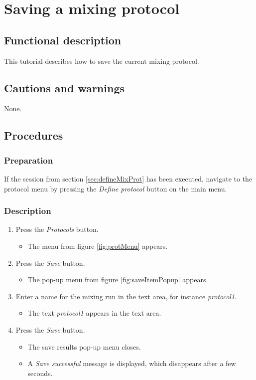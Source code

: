 
\section{Saving a mixing protocol}\label{sec:savmixprot}

\subsection{Functional description}
This tutorial describes how to save the current mixing protocol.

\subsection{Cautions and warnings}
None.

\subsection{Procedures}

\subsubsection{Preparation}
If the session from section \ref{sec:defineMixProt} has been executed, navigate to the protocol menu by pressing the \emph{Define protocol} button on the main menu.

\subsubsection{Description}
\begin{enumerate}
	\item Press the \emph{Protocols} button.
		\begin{itemize}
			\item The menu from figure \ref{fig:protMenu} appears.
		\end{itemize}
	\item Press the \emph{Save} button.
		\begin{itemize}
			\item The pop-up menu from figure \ref{fig:saveItemPopup} appears.
		\end{itemize}
	\item Enter a name for the mixing run in the text area, for instance \emph{protocol1}. \label{item:savmixprotName}
		\begin{itemize}
			\item The text \emph{protocol1} appears in the text area.
		\end{itemize}
	\item Press the \emph{Save} button.
		\begin{itemize}
			\item The save results pop-up menu closes.
			\item A \emph{Save successful} message is displayed, which disappears after a few seconds.
		\end{itemize}
\end{enumerate}

